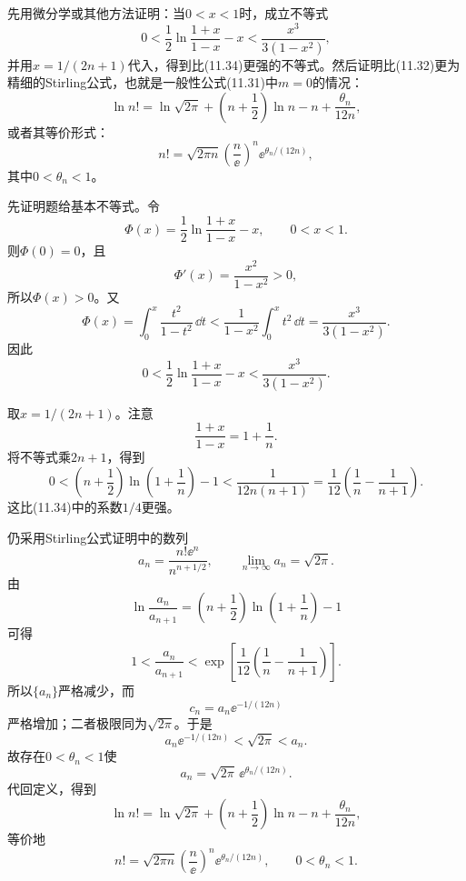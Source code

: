 \begin{xreferenceproblem}[15]
先用微分学或其他方法证明：当$0<x<1$时，成立不等式
  \[
    0<\frac12\ln\frac{1+x}{1-x}-x<\frac{x^3}{3(1-x^2)},
  \]
  并用$x=1/(2n+1)$代入，得到比(11.34)更强的不等式。然后证明比(11.32)更为精细的Stirling公式，也就是一般性公式(11.31)中$m=0$的情况：
  \[
    \ln n!=\ln\sqrt{2\pi}+\left(n+\frac12\right)\ln n-n+\frac{\theta_n}{12n},
  \]
  或者其等价形式：
  \[
    n!=\sqrt{2\pi n}\left(\frac n\ee\right)^n\ee^{\theta_n/(12n)},
  \]
  其中$0<\theta_n<1$。
\end{xreferenceproblem}
\begin{xsolution}
先证明题给基本不等式。令
\[
 \Phi(x)=\frac12\ln\frac{1+x}{1-x}-x,
 \qquad 0<x<1.
\]
则$\Phi(0)=0$，且
\[
 \Phi'(x)=\frac{x^2}{1-x^2}>0,
\]
所以$\Phi(x)>0$。又
\[
 \Phi(x)=\int_0^x\frac{t^2}{1-t^2}\,\dd t
 <\frac1{1-x^2}\int_0^xt^2\,\dd t
 =\frac{x^3}{3(1-x^2)}.
\]
因此
\[
 0<\frac12\ln\frac{1+x}{1-x}-x
 <\frac{x^3}{3(1-x^2)}.
\]

取$x=1/(2n+1)$。注意
\[
 \frac{1+x}{1-x}=1+\frac1n.
\]
将不等式乘$2n+1$，得到
\[
 0<\left(n+\frac12\right)\ln\left(1+\frac1n\right)-1
 <\frac1{12n(n+1)}
 =\frac1{12}\left(\frac1n-\frac1{n+1}\right).
\]
这比(11.34)中的系数$1/4$更强。

仍采用Stirling公式证明中的数列
\[
 a_n=\frac{n!\ee^n}{n^{n+1/2}},
 \qquad \lim_{n\to\infty}a_n=\sqrt{2\pi}.
\]
由
\[
 \ln\frac{a_n}{a_{n+1}}
 =\left(n+\frac12\right)\ln\left(1+\frac1n\right)-1
\]
可得
\[
 1<\frac{a_n}{a_{n+1}}
 <\exp\left[\frac1{12}\left(\frac1n-\frac1{n+1}\right)\right].
\]
所以$\{a_n\}$严格减少，而
\[
 c_n=a_n\ee^{-1/(12n)}
\]
严格增加；二者极限同为$\sqrt{2\pi}$。于是
\[
 a_n\ee^{-1/(12n)}<\sqrt{2\pi}<a_n.
\]
故存在$0<\theta_n<1$使
\[
 a_n=\sqrt{2\pi}\,\ee^{\theta_n/(12n)}.
\]
代回定义，得到
\[
 \boxed{
 \ln n!=\ln\sqrt{2\pi}+\left(n+\frac12\right)\ln n-n
 +\frac{\theta_n}{12n}},
\]
等价地
\[
 \boxed{
 n!=\sqrt{2\pi n}\left(\frac n\ee\right)^n
 \ee^{\theta_n/(12n)},\qquad0<\theta_n<1}.
\]
\end{xsolution}


